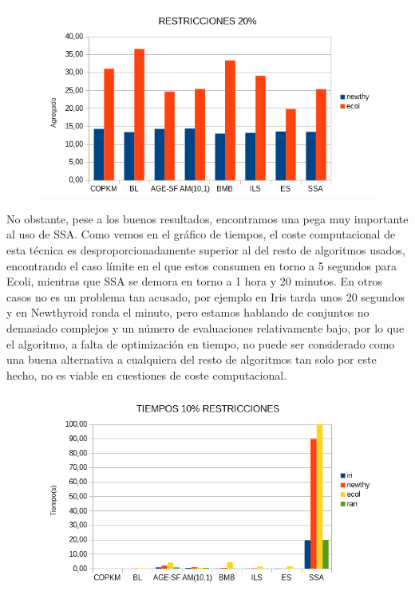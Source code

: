 \documentclass{article}
\begin{document}
	\begin{figure}[H]
		\includegraphics[width=\linewidth]{imagenes/f_20.png}
		\label{fig:boat4}
	\end{figure}
	\newpage
	No obstante, pese a los buenos resultados, encontramos una pega muy importante al uso de SSA. Como vemos en el gráfico de tiempos, el coste computacional de esta técnica es desproporcionadamente superior al del resto de algoritmos usados, encontrando el caso límite en el que estos consumen en torno a 5 segundos para Ecoli, mientras que SSA se demora en torno a 1 hora y 20 minutos. En otros casos no es un problema tan acusado, por ejemplo en Iris tarda unos 20 segundos y en Newthyroid ronda el minuto, pero estamos hablando de conjuntos no demasiado complejos y un número de evaluaciones relativamente bajo, por lo que el algoritmo, a falta de optimización en tiempo, no puede ser considerado como una buena alternativa a cualquiera del resto de algoritmos tan solo por este hecho, no es viable en cuestiones de coste computacional.

	\begin{figure}[H]
		\includegraphics[width=\linewidth]{imagenes/time.png}
		\label{fig:boat5}
	\end{figure}
	
\end{document}
